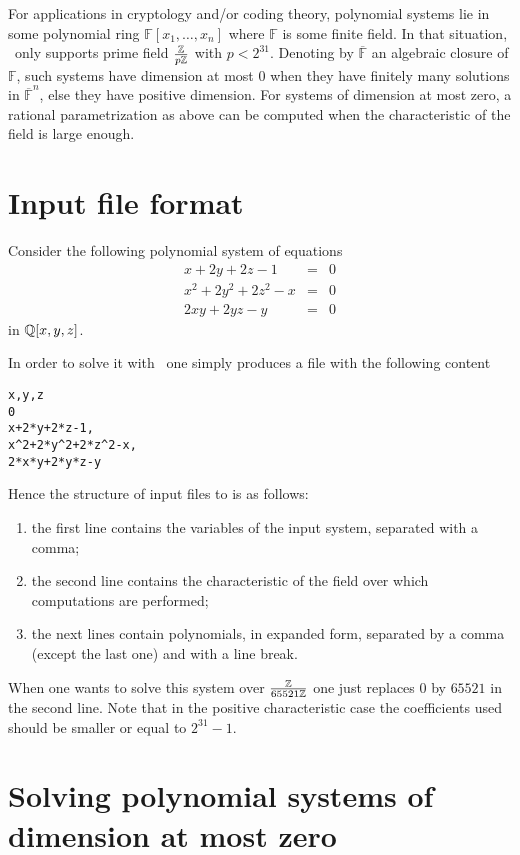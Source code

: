 \documentclass[a4paper,english,11pt]{scrartcl}
\theoremstyle{definition}
\theoremstyle{remark}
\newcommand{\bF}{{\mathbb{F}}}
\begin{document}
For applications in cryptology and/or coding theory, polynomial systems lie in
some polynomial ring $\bF[x_1, \ldots, x_n]$ where $\bF$ is some finite field. In
that situation, \msolve~only supports prime field $\frac{\mathbb{Z}}{p\mathbb{Z}}$ with $p <
2^{31}$. Denoting by $\overline{\bF}$ an algebraic closure of $\bF$, such systems
have dimension at most $0$ when they have finitely many solutions in
$\overline{\bF}^n$, else they have positive dimension. For systems of dimension
at most zero, a rational parametrization as above can be computed when the
characteristic of the field is large enough. 

\section{Input file format}

Consider the following polynomial system of equations
\[
  \begin{array}{rcl}
    x+2 y+2 z-1 &= &0\\
    x^2+2 y^2+2 z^2-x &= &0\\
    2 x y+2 y z-y &= &0
  \end{array}
\]
in $\mathbb{Q}[x,y,z]$.

In order to solve it with \msolve~one simply produces a file with the following content
\begin{tcolorbox}
\begin{verbatim}
x,y,z
0
x+2*y+2*z-1,
x^2+2*y^2+2*z^2-x,
2*x*y+2*y*z-y
\end{verbatim}  
\end{tcolorbox}
Hence the structure of input files to \msolve is as follows:
\begin{enumerate}
\item the first line contains the variables of the input system, separated with
  a comma; 
\item the second line contains the characteristic of the field over which
  computations are performed; 
\item the next lines contain polynomials, in expanded form, separated by a comma
  (except the last one) and with a line break. 
\end{enumerate}



When one wants to solve this system over $\frac{\mathbb{Z}}{65521\mathbb{Z}}$ one just replaces
$0$ by $65521$ in the second line. Note that in the positive characteristic case
the coefficients used should be smaller or equal to $2^{31}-1$.
\section{Solving polynomial systems of dimension at most zero}\label{sec:zerodim}
\end{document}
